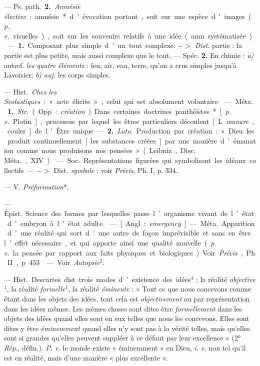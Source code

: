 \begin{itemize}[leftmargin=1cm, label=, itemsep=1pt]
— \si{Ps. path.} {\bf 2.} {\it Amnésie élective} :
amnésie* d’évocation portant, soit sur une espèce d'images
({\it p. e.} visuelles), soit sur les souvenirs relatifs
à une idée (amn. systématisée).

 — {\bf 1.} Composant plus simple
d'un tout complexe. $->$ {\it Dist.}
partie : la partie est plus petite,
mais aussi complexe que le tout. —
Spéc. {\bf 2.} En chimie : {\it a)} autref. {\it les
quatre éléments} : feu, air, eau, terre,
qu’on a crus simples jusqu’à Lavoisier; {\it b)}  {\it auj.} les corps simples.

 — \si{Hist.} {\it Chez les Scolastiques} :
« acte élicite », celui qui est absolument volontaire.

 — \si{Méta.} {\bf 1.} {\it Str.} (Opp. :
{\it création}). Dans certaines doctrines
panthéistes* [{\it p. e.} Plotin], processus
par lequel les êtres particuliers
découlent [L. {\it manare}, couler] de
l'Être unique. — {\bf 2.} {\it Lato.} Production par création :
« Dieu les produit continuellement [les substances
créées] par une manière d'émanation comme nous produisons nos
pensées» (Leibniz, \si{Disc. Méta.}, XIV).

 — \si{Soc.} Représentations
figurées qui symbolisent les idéaux
collectifs. — $->$ Dist. {\it symbole} :
voir  {\it Précis}, Ph. I, p. 334.

 — V. {\it Préformation}*.

 — \si{Épist.} Science des
formes par lesquelles passe l’organisme vivant de l’état d’embryon à
l’état adulte.

 — [Angl. : {\it emergency}] —
\si{Méta.} Apparition d’une réalité qui
sort d’une autre de façon imprévisible et sans en être l'effet
nécessaire, et qui apporte ainsi une qualité nouvelle ({\it p. e.}
la pensée par rapport aux faits physiques et biologiques). Voir
{\it Précis}, Ph. II, p. 453.

 — Voir {\it Autopsie}$^2$.

 — \si{Hist.} Descartes dist. trois
modes d’existence des idées$^4$ : la
réalité {\it objective}$^1$, la réalité {\it formelle}$^1$,
la réalité {\it éminente} : « Tout ce que
nous concevons comme étant dans
les objets des idées, tout cela est
{\it objectivement} ou par représentation
dans les idées mêmes. Les mêmes
choses sont dites être {\it formellement}
dans les objets des idées quand elles
sont en eux telles que nous les concevons. Elles sont dites y être
{\it éminemment} quand elles n’y sont pas
à la vérité telles, mais qu’elles sont
si grandes qu’elles peuvent suppléer
à ce défaut par leur excellence »
(2° {\it Rép.}, défin.). {\it P. e.} le monde existe
« éminemment » en Dieu, {\it i. e.} non
tel qu’il est en réalité, mais d’une
manière « plus excellente ».


\end{itemize}
